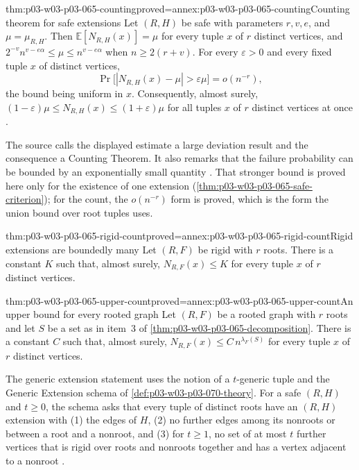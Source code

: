\begin{hbtheorem}{thm:p03-w03-p03-065-counting}{proved=annex:p03-w03-p03-065-counting}{Counting theorem for safe extensions}
Let \((R,H)\) be safe with parameters \(r,v,e\), and \(\mu=\mu_{R,H}\).
Then \(\mathbb E[N_{R,H}(x)]=\mu\) for every tuple \(x\) of \(r\) distinct
vertices, and \(2^{-v}n^{v-e\alpha}\leq\mu\leq n^{v-e\alpha}\) when
\(n\geq2(r+v)\).  For every \(\varepsilon>0\) and every fixed tuple \(x\) of
distinct vertices,
\[
  \Pr\bigl[|N_{R,H}(x)-\mu|>\varepsilon\mu\bigr]=o(n^{-r}),
\]
the bound being uniform in \(x\).  Consequently, almost surely,
\((1-\varepsilon)\mu\leq N_{R,H}(x)\leq(1+\varepsilon)\mu\) for all tuples
\(x\) of \(r\) distinct vertices at once
\cite[pp.~10--11]{Spencer2007LogicRandomStructuresAuthor}.
\end{hbtheorem}

The source calls the displayed estimate a large deviation result and the
consequence a Counting Theorem.  It also remarks that the failure probability
can be bounded by an exponentially small quantity
\cite[p.~10]{Spencer2007LogicRandomStructuresAuthor}.  That stronger bound is
proved here only for the existence of one extension
(\cref{thm:p03-w03-p03-065-safe-criterion}); for the count, the
\(o(n^{-r})\) form is proved, which is the form the union bound over root
tuples uses.

\begin{hblemma}{thm:p03-w03-p03-065-rigid-count}{proved=annex:p03-w03-p03-065-rigid-count}{Rigid extensions are boundedly many}
Let \((R,F)\) be rigid with \(r\) roots.  There is a constant \(K\) such
that, almost surely, \(N_{R,F}(x)\leq K\) for every tuple \(x\) of \(r\)
distinct vertices.
\end{hblemma}

\begin{hbcorollary}{thm:p03-w03-p03-065-upper-count}{proved=annex:p03-w03-p03-065-upper-count}{An upper bound for every rooted graph}
Let \((R,F)\) be a rooted graph with \(r\) roots and let \(S\) be a set as
in item~3 of \cref{thm:p03-w03-p03-065-decomposition}.  There is a constant
\(C\) such that, almost surely, \(N_{R,F}(x)\leq C\,n^{\lambda_F(S)}\) for
every tuple \(x\) of \(r\) distinct vertices.
\end{hbcorollary}

The generic extension statement uses the notion of a \(t\)-generic tuple and
the Generic Extension schema of \cref{def:p03-w03-p03-070-theory}.  For a
safe \((R,H)\) and \(t\geq0\), the schema asks that every tuple of distinct
roots have an \((R,H)\) extension with (1) the edges of \(H\), (2) no further
edges among its nonroots or between a root and a nonroot, and (3) for
\(t\geq1\), no set of at most \(t\) further vertices that is rigid over roots
and nonroots together and has a vertex adjacent to a nonroot
\cite[p.~10]{Spencer2007LogicRandomStructuresAuthor}.

